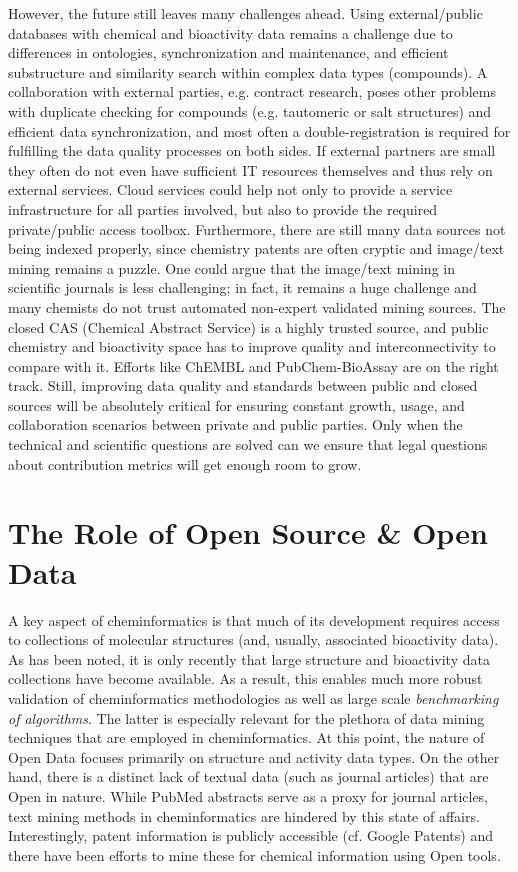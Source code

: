 \documentclass{sig-alternate}
\begin{document}
However, the future still leaves many challenges ahead. Using external/public databases
with chemical and bioactivity data remains a challenge due to differences in
ontologies, synchronization and maintenance, and efficient
substructure and similarity search within complex data types
(compounds). A
collaboration with external parties, e.g. contract research, poses other
problems with duplicate checking for compounds (e.g. tautomeric or salt
structures) and efficient data synchronization, and most often a double-registration is
required for fulfilling the data quality processes on both sides. If external
partners are small they often do not even have sufficient IT resources
themselves and thus rely on external services. Cloud services could help
not only to provide a service infrastructure for all parties involved,
but also to provide the required private/public access toolbox. Furthermore,
there are still many data sources not being indexed properly, since chemistry
patents are often cryptic and image/text mining remains a puzzle. One could
argue that the image/text mining in scientific journals is less challenging; in
fact, it remains a huge challenge and many chemists do not trust automated
non-expert validated mining sources. The closed CAS (Chemical Abstract Service)
is a highly trusted source, and public chemistry and bioactivity space has to
improve quality and interconnectivity to compare with it. Efforts like ChEMBL and PubChem-BioAssay
are on the right track. Still, improving data quality and standards between
public and closed sources will be absolutely critical for ensuring constant
growth, usage, and collaboration scenarios between private and public parties.
Only when the technical and scientific questions are solved can we ensure that
legal questions about contribution metrics will get enough room to grow.

\section{The Role of Open Source \& Open Data}
\label{sec:role-open-source}

A key aspect of cheminformatics is that much of its development
requires access to collections of molecular structures (and, usually,
associated bioactivity data). As has been noted, it is only recently
that large structure and bioactivity data collections have become
available. As a result, this enables much more robust validation of
cheminformatics methodologies as well as large scale \emph{benchmarking of
algorithms}. The latter is especially relevant for the plethora of
data mining techniques that are employed in cheminformatics. At this
point, the nature of Open Data focuses primarily on structure and
activity data types. On the other hand, there is a distinct lack of
textual data (such as journal articles) that are Open in nature. While
PubMed abstracts serve as a proxy for journal articles, text mining
methods in cheminformatics are hindered by this state of affairs.
Interestingly, patent information is publicly accessible (cf. Google
Patents) and there have been efforts to mine these for chemical
information using Open tools.
\end{document}
